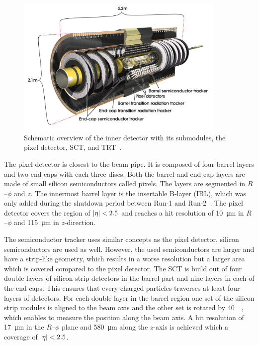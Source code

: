 \begin{figure}[htb]
    \centering
    \includegraphics[width=0.9\textwidth]{./figures/setup/inner_detector.jpg}
    \caption{Schematic overview of the inner detector with its submodules, the pixel detector, SCT, and TRT~\cite{ATLAS}.}\label{fig:setup:id}
\end{figure}

The pixel detector is closest to the beam pipe.
It is composed of four barrel layers and two end-caps with each three discs.
Both the barrel and end-cap layers are made of small silicon semiconductors called pixels.
The layers are segmented in $R$\nobreakdash--$\phi$ and $z$.
The innermost barrel layer is the insertable B-layer (IBL), which was only added during the shutdown period
between Run-1 and Run-2~\cite{ATLAS-TDR-19}.
The pixel detector covers the region of $\left|\eta\right| < 2.5$ and reaches a hit resolution of \SI{10}{\um} in
$R$\nobreakdash--$\phi$ and \SI{115}{\um} in $z$-direction.

The semiconductor tracker uses similar concepts as the pixel detector, silicon semiconductors are used as well.
However, the used semiconductors are larger and have a strip-like geometry, which results in a worse resolution
but a larger area which is covered compared to the pixel detector.
The SCT is build out of four double layers of silicon strip detectors in the barrel part and nine layers in each of the
end-caps.
This ensures that every charged particles traverses at least four layers of detectors.
For each double layer in the barrel region one set of the silicon strip modules is aligned to the beam axis and the other set
is rotated by \SI{40}{\milli\rad}, which enables to measure the position along the beam axis.
A hit resolution of \SI{17}{\um} in the $R$\nobreakdash--$\phi$ plane and \SI{580}{\um} along the
$z$-axis is achieved which a coverage of $\left|\eta\right| < 2.5$.

